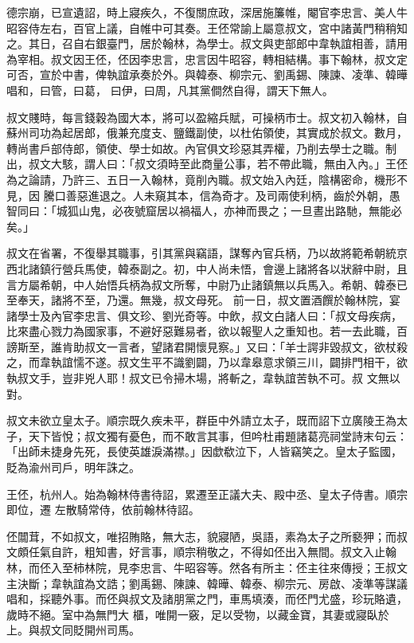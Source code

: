 \begin{pinyinscope}
 德宗崩，已宣遺詔，時上寢疾久，不復關庶政，深居施簾帷，閹官李忠言、美人牛昭容侍左右，百官上議，自帷中可其奏。王伾常諭上屬意叔文，宮中諸黃門稍稍知之。其日，召自右銀臺門，居於翰林，為學士。叔文與吏部郎中韋執誼相善，請用為宰相。叔文因王伾，伾因李忠言，忠言因牛昭容，轉相結構。事下翰林，叔文定可否，宣於中書，俾執誼承奏於外。與韓泰、柳宗元、劉禹錫、陳諫、凌準、韓曄唱和，曰管，曰葛，
 曰伊，曰周，凡其黨僴然自得，謂天下無人。



 叔文賤時，每言錢穀為國大本，將可以盈縮兵賦，可操柄市士。叔文初入翰林，自蘇州司功為起居郎，俄兼充度支、鹽鐵副使，以杜佑領使，其實成於叔文。數月，轉尚書戶部侍郎，領使、學士如故。內官俱文珍惡其弄權，乃削去學士之職。制出，叔文大駭，謂人曰：「叔文須時至此商量公事，若不帶此職，無由入內。」王伾為之論請，乃許三、五日一入翰林，竟削內職。叔文始入內廷，陰構密命，機形不見，因
 騰口善惡進退之。人未窺其本，信為奇才。及司兩使利柄，齒於外朝，愚智同曰：「城狐山鬼，必夜號窟居以禍福人，亦神而畏之；一旦晝出路馳，無能必矣。」



 叔文在省署，不復舉其職事，引其黨與竊語，謀奪內官兵柄，乃以故將範希朝統京西北諸鎮行營兵馬使，韓泰副之。初，中人尚未悟，會邊上諸將各以狀辭中尉，且言方屬希朝，中人始悟兵柄為叔文所奪，中尉乃止諸鎮無以兵馬入。希朝、韓泰已至奉天，諸將不至，乃還。無幾，叔文母死。
 前一日，叔文置酒饌於翰林院，宴諸學士及內官李忠言、俱文珍、劉光奇等。中飲，叔文白諸人曰：「叔文母疾病，比來盡心戮力為國家事，不避好惡難易者，欲以報聖人之重知也。若一去此職，百謗斯至，誰肯助叔文一言者，望諸君開懷見察。」又曰：「羊士諤非毀叔文，欲杖殺之，而韋執誼懦不遂。叔文生平不識劉闢，乃以韋皋意求領三川，闢排門相干，欲執叔文手，豈非兇人耶！叔文已令掃木場，將斬之，韋執誼苦執不可。叔
 文無以對。



 叔文未欲立皇太子。順宗既久疾未平，群臣中外請立太子，既而詔下立廣陵王為太子，天下皆悅；叔文獨有憂色，而不敢言其事，但吟杜甫題諸葛亮祠堂詩末句云：「出師未捷身先死，長使英雄淚滿襟。」因歔欷泣下，人皆竊笑之。皇太子監國，貶為渝州司戶，明年誅之。



 王伾，杭州人。始為翰林侍書待詔，累遷至正議大夫、殿中丞、皇太子侍書。順宗即位，遷
 左散騎常侍，依前翰林待詔。



 伾闒茸，不如叔文，唯招賄賂，無大志，貌寢陋，吳語，素為太子之所褻狎；而叔文頗任氣自許，粗知書，好言事，順宗稍敬之，不得如伾出入無間。叔文入止翰林，而伾入至柿林院，見李忠言、牛昭容等。然各有所主：伾主往來傳授；王叔文主決斷；韋執誼為文誥；劉禹錫、陳諫、韓曄、韓泰、柳宗元、房啟、凌準等謀議唱和，採聽外事。而伾與叔文及諸朋黨之門，車馬填湊，而伾門尤盛，珍玩賂遺，歲時不絕。室中為無門大
 櫃，唯開一竅，足以受物，以藏金寶，其妻或寢臥於上。與叔文同貶開州司馬。




\end{pinyinscope}
